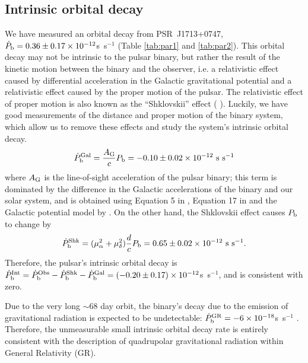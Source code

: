 \subsection{Intrinsic orbital decay}
\label{sec:obdecay}
We have measured an orbital decay from PSR~J1713+0747, $\dot{P}_{\rm b} =
0.36\pm0.17\times10^{-12}$s~s$^{-1}$ (Table \ref{tab:par1} and \ref{tab:par2}).
This orbital decay may not be intrinsic to the pulsar binary, but rather the
result of the kinetic motion between the binary and the
observer, i.e. a relativistic effect caused by differential 
acceleration in the Galactic gravitational potential
\citep{dt91} and a relativistic effect caused by the proper motion of the
pulsar. The relativistic effect
of proper motion is also known as the ``Shklovskii'' effect (
\citealt{shk70}). Luckily, we have good measurements of the distance and proper
motion of the binary system, which allow us to remove these effects and study the system's intrinsic orbital decay.
\begin{equation}
\dot{P}_{\rm b}^{\rm Gal} = \frac{A_{\rm G}}{c} P_{\rm b} =
-0.10\pm0.02\times10^{-12}~{\rm s~s^{-1}}
\end{equation}
where $A_{\rm G}$ is the line-of-sight acceleration of the pulsar binary;
this term is dominated by the difference in the Galactic accelerations of the
binary and our solar system, and is obtained using
Equation 5 in \citet{nt95}, Equation 17 in \citet{lwj+09} and the Galactic
potential model by \citet{hf04a}.
On the other hand, the Shklovskii effect causes $P_{\rm b}$ to
change by
\begin{equation}
\dot{P}_{\rm b}^{\rm Shk} = (\mu_{\alpha}^2+\mu_{\delta}^2)\frac{d}{c}P_{\rm
b} = 0.65\pm0.02\times10^{-12}~{\rm s~s^{-1}}.
\end{equation}
Therefore, the pulsar's intrinsic orbital decay is $\dot{P}_{\rm b}^{\rm Int}
= \dot{P}_{\rm b}^{\rm Obs} - \dot{P}_{\rm b}^{\rm Shk} - \dot{P}_{\rm b}^{\rm
Gal} = (-0.20\pm0.17)\times10^{-12}$s~s$^{-1}$, and is consistent with zero.

Due to the very long $\sim$68 day orbit, the binary's decay due to the
emission of gravitational
radiation is expected to be undetectable: $\dot{P}_{\rm b}^{\rm GR} =
-6\times10^{-18}$s~s$^{-1}$ \citep{lk05}.  Therefore, the unmeasurable small 
intrinsic orbital decay rate is entirely consistent with the
description of quadrupolar gravitational radiation within General
Relativity (GR).

